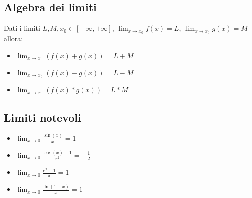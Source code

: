 \documentclass{subfiles}
\begin{document}
\subsection{Algebra dei limiti}

Dati i limiti $L, M, x_0 \in [ -\infty , +\infty ]$, $\lim_{x \to x_0} f(x) = L$, $\lim_{x \to x_0} g(x) = M$ allora:

\begin{itemize}
    \item $\lim_{x \to x_0} (f(x) + g(x)) = L + M$
    \item $\lim_{x \to x_0} (f(x) - g(x)) = L - M$
    \item $\lim_{x \to x_0} (f(x) * g(x)) = L * M$
\end{itemize}

\subsection{Limiti notevoli}

\begin{itemize}
    \item $\lim_{x \to 0} \frac{\sin(x)}{x} = 1$
    \item $\lim_{x \to 0} \frac{\cos(x) - 1}{x^2} = -\frac{1}{2}$
    \item $\lim_{x \to 0} \frac{e^x - 1}{x} = 1$
    \item $\lim_{x \to 0} \frac{\ln(1 + x)}{x} = 1$
\end{itemize}
\end{document}
